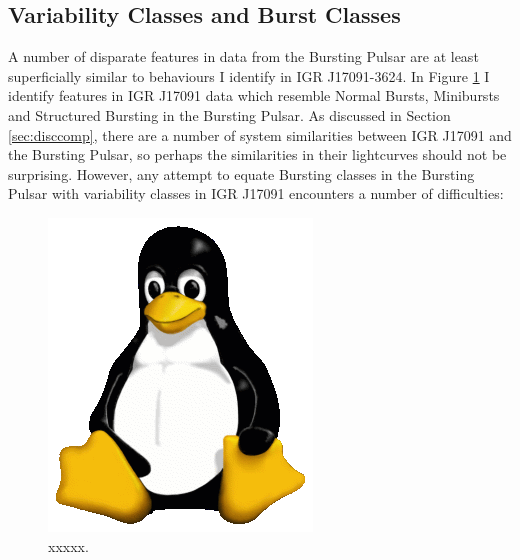\subsection{Variability Classes and Burst Classes}

\par A number of disparate features in data from the Bursting Pulsar are at least superficially similar to behaviours I identify in IGR J17091-3624.  In Figure \ref{fig:BP_with_IGR} I identify features in IGR J17091 data which resemble Normal Bursts, Minibursts and Structured Bursting in the Bursting Pulsar.  As discussed in Section \ref{sec:disccomp}, there are a number of system similarities between IGR J17091 and the Bursting Pulsar, so perhaps the similarities in their lightcurves should not be surprising.  However, any attempt to equate Bursting classes in the Bursting Pulsar with variability classes in IGR J17091 encounters a number of difficulties:

\begin{figure}
  \centering
  \includegraphics[width=.9\linewidth, trim= 10mm 8mm 10mm 10mm,clip]{images/placeholder.png}
  \caption[xxxxx]{xxxxx.}
  \label{fig:BP_with_IGR}
\end{figure}

